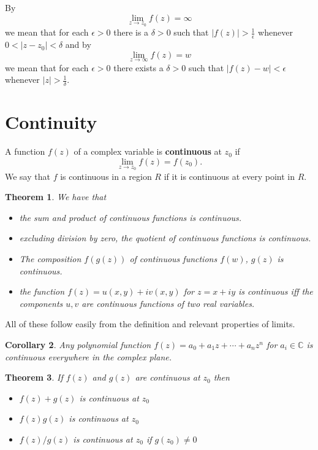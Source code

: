 \documentclass[a4paper,10pt]{article}
\newcommand{\C}{\mathbb{C}}
\newtheorem{theorem}{Theorem}[section]
\newtheorem{corollary}[theorem]{Corollary}
\newenvironment{definition}[1][Definition]{\begin{trivlist}
\item[\hskip \labelsep {\bfseries #1}]}{\end{trivlist}}
\begin{document}
\begin{definition}
By 
$$\lim_{z \to z_0}f(z) = \infty$$
we mean that for each $\epsilon > 0$ there is a $\delta > 0$ such that $|f(z)| > \frac{1}{\epsilon}$ whenever $0 < |z - z_0| < \delta$ and by
$$\lim_{z\to \infty}f(z) = w$$
we mean that for each $\epsilon > 0$ there exists a $\delta > 0$ such that $|f(z) - w| < \epsilon$ whenever $|z| > \frac{1}{\delta}$.
\end{definition}

\section{Continuity}

\begin{definition}
A function $f(z)$ of a complex variable is \textbf{continuous} at $z_0$ if 
$$\lim_{z \to z_0}f(z) = f(z_0).$$
We say that $f$ is continuous in a region $R$ if it is continuous at every point in $R$.
\end{definition}

\begin{theorem}
We have that
\begin{itemize}
\item the sum and product of continuous functions is continuous. 
\item excluding division by zero, the quotient of continuous functions is continuous. 
\item The composition $f(g(z))$ of continuous functions $f(w)$, $g(z)$ is continuous. 
\item the function $f(z) = u(x, y) + iv(x, y)$ for $z = x + iy$ is continuous iff the components $u, v$ are continuous functions of two real variables.
\end{itemize}
\end{theorem}

All of these follow easily from the definition and relevant properties of limits.

\begin{corollary}
Any polynomial function $f(z) = a_0 + a_1z + \cdots + a_nz^n$ for $a_i \in \C$ is continuous everywhere in the complex plane.
\end{corollary}

\begin{theorem}
If $f(z)$ and $g(z)$ are continuous at $z_0$ then
\begin{itemize}
\item $f(z) + g(z)$ is continuous at $z_0$
\item $f(z)g(z)$ is continuous at $z_0$
\item $f(z)/g(z)$ is continuous at $z_0$ if $g(z_0) \neq 0$
\end{itemize}
\end{theorem}
\end{document}
